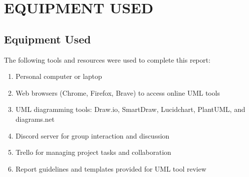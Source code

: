 \chapter{EQUIPMENT USED}
\section{Equipment Used}

The following tools and resources were used to complete this report:
\begin{enumerate}
    \item Personal computer or laptop
    \item Web browsers (Chrome, Firefox, Brave) to access online UML tools
    \item UML diagramming tools: Draw.io, SmartDraw, Lucidchart, PlantUML, and diagrams.net
    \item Discord server for group interaction and discussion
    \item Trello for managing project tasks and collaboration
    \item Report guidelines and templates provided for UML tool review
\end{enumerate}







